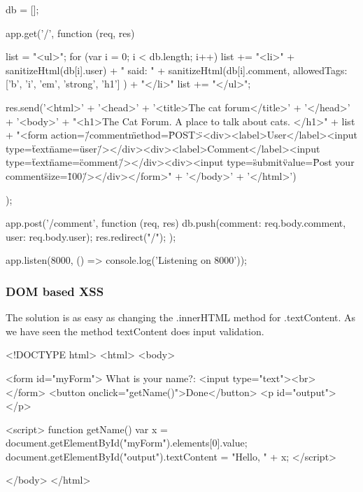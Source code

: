 \begin{Answer}[ref={websec-xss-prevention}]
\begin{js}
db = [];

app.get('/', function (req, res) {
  list = "<ul>";
  for (var i = 0; i < db.length; i++) {
    list += "<li>" + sanitizeHtml(db[i].user) + " said: " + sanitizeHtml(db[i].comment, {
      allowedTags: ['b', 'i', 'em', 'strong', 'h1']
    }) + "</li>"
  }
  list += "</ul>";
  
  res.send('<html>' +
    '<head>' +
    '<title>The cat forum</title>' +
    '</head>' +
    '<body>' +
    "<h1>The Cat Forum. A place to talk about cats. </h1>" +
    list +
    "<form action=\"/comment\" method=\"POST\"><div><label>User</label><input type=\"text\" name=\"user\"/></div><div><label>Comment</label><input type=\"text\" name=\"comment\"/></div><div><input type=\"submit\" value=\"Post your comment\" size=\"100\"/></div></form>" +
    '</body>' +
  '</html>')
});

app.post('/comment', function (req, res) {
  db.push({comment: req.body.comment, user: req.body.user});
  res.redirect("/");
});

app.listen(8000, () => console.log('Listening on 8000'));
\end{js}
\subsubsection{DOM based XSS}
The solution is as easy as changing the .innerHTML method for .textContent. As we have seen the method textContent does input validation.
\begin{js}
<!DOCTYPE html>
<html>
<body>

  <form id="myForm">
    What is your name?: <input type="text"><br>
  </form>
  <button onclick="getName()">Done</button>
  <p id="output"></p>
  
  <script>
  function getName(){
    var x = document.getElementById("myForm").elements[0].value;
    document.getElementById("output").textContent = "Hello, " + x;
  }
  </script>

</body>
</html>
\end{js}
\end{Answer}